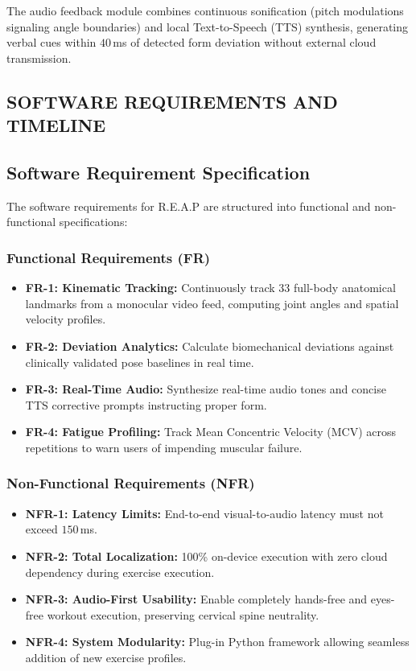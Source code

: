 \documentclass[12pt,a4paper]{report}
\begin{document}
The audio feedback module combines continuous sonification (pitch modulations signaling angle boundaries) and local Text-to-Speech (TTS) synthesis, generating verbal cues within $40$\,ms of detected form deviation without external cloud transmission.

\begin{center}
    \justifying
    \chapter{SOFTWARE REQUIREMENTS AND TIMELINE}
\end{center}

\section{Software Requirement Specification}
The software requirements for R.E.A.P are structured into functional and non-functional specifications:

\subsection{Functional Requirements (FR)}
\begin{itemize}[label=$\blacktriangleright$]
    \item \textbf{FR-1: Kinematic Tracking:} Continuously track 33 full-body anatomical landmarks from a monocular video feed, computing joint angles and spatial velocity profiles.
    \item \textbf{FR-2: Deviation Analytics:} Calculate biomechanical deviations against clinically validated pose baselines in real time.
    \item \textbf{FR-3: Real-Time Audio:} Synthesize real-time audio tones and concise TTS corrective prompts instructing proper form.
    \item \textbf{FR-4: Fatigue Profiling:} Track Mean Concentric Velocity (MCV) across repetitions to warn users of impending muscular failure.
\end{itemize}

\subsection{Non-Functional Requirements (NFR)}
\begin{itemize}[label=$\blacktriangleright$]
    \item \textbf{NFR-1: Latency Limits:} End-to-end visual-to-audio latency must not exceed $150$\,ms.
    \item \textbf{NFR-2: Total Localization:} 100\% on-device execution with zero cloud dependency during exercise execution.
    \item \textbf{NFR-3: Audio-First Usability:} Enable completely hands-free and eyes-free workout execution, preserving cervical spine neutrality.
    \item \textbf{NFR-4: System Modularity:} Plug-in Python framework allowing seamless addition of new exercise profiles.
\end{itemize}
\end{document}
